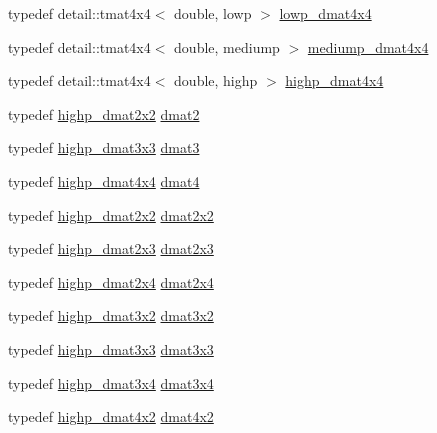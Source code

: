 \begin{CompactItemize}
\item 
typedef detail::tmat4x4$<$ double, lowp $>$ \hyperlink{group__core__precision_gc762dec40f53114dfe6894499a2c9a79}{lowp\_\-dmat4x4}
\item 
typedef detail::tmat4x4$<$ double, mediump $>$ \hyperlink{group__core__precision_gd64329d45b05417ccf0cc3c23f584d26}{mediump\_\-dmat4x4}
\item 
typedef detail::tmat4x4$<$ double, highp $>$ \hyperlink{group__core__precision_g1c0a2edbde597b59e9005691a224b208}{highp\_\-dmat4x4}
\item 
typedef \hyperlink{group__core__precision_ga5e35f6570d394c1cd34f411a473220c}{highp\_\-dmat2x2} \hyperlink{group__core__types_gd8c130d26c4cd9a1a831c1a74292a8f6}{dmat2}
\item 
typedef \hyperlink{group__core__precision_gd7229dea82287910d88e6e8566e39fc7}{highp\_\-dmat3x3} \hyperlink{group__core__types_g25fd62195c3ef5ac0d32ead1dbfbb929}{dmat3}
\item 
typedef \hyperlink{group__core__precision_g1c0a2edbde597b59e9005691a224b208}{highp\_\-dmat4x4} \hyperlink{group__core__types_g7f7c1300ebfd19d573e9deb1e8758b54}{dmat4}
\item 
typedef \hyperlink{group__core__precision_ga5e35f6570d394c1cd34f411a473220c}{highp\_\-dmat2x2} \hyperlink{group__core__types_ge9932771e11a4f38e21f1136423bab18}{dmat2x2}
\item 
typedef \hyperlink{group__core__precision_gfec7367665f006f2a7643103c5eddc38}{highp\_\-dmat2x3} \hyperlink{group__core__types_g6b5ff9888ca0e468f35b637d4c3a361d}{dmat2x3}
\item 
typedef \hyperlink{group__core__precision_gcd51d8188f7d66a83c035b8c4cd69f2d}{highp\_\-dmat2x4} \hyperlink{group__core__types_g2d1dd4b4925d1ea67539902c820483a0}{dmat2x4}
\item 
typedef \hyperlink{group__core__precision_gc956fe6b946f0ccee78367ccd5427351}{highp\_\-dmat3x2} \hyperlink{group__core__types_g2db259d2e7921065c5b7d4dca9547960}{dmat3x2}
\item 
typedef \hyperlink{group__core__precision_gd7229dea82287910d88e6e8566e39fc7}{highp\_\-dmat3x3} \hyperlink{group__core__types_gf3c29c4f75a448f308463e75ca2efd4c}{dmat3x3}
\item 
typedef \hyperlink{group__core__precision_gff199c8d04a8edb92ed43283e8694c59}{highp\_\-dmat3x4} \hyperlink{group__core__types_g19e745a83cba85f57afa1232276dcc96}{dmat3x4}
\item 
typedef \hyperlink{group__core__precision_ga4fb1ed350a6cd053abb9b093d13ce0d}{highp\_\-dmat4x2} \hyperlink{group__core__types_gb3d51ce41e6f0aa267d3e185cee09c44}{dmat4x2}

\end{CompactItemize}
